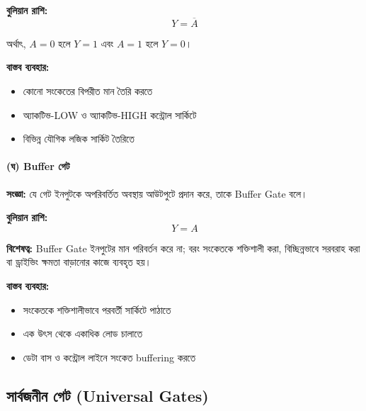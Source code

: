 \textbf{বুলিয়ান রাশি:}
\[
Y=\overline A
\]

অর্থাৎ, \(A=0\) হলে \(Y=1\) এবং \(A=1\) হলে \(Y=0\)।

\textbf{বাস্তব ব্যবহার:}
\begin{itemize}[label={{\bulletfont\textbullet}}, leftmargin=*, nosep]
    \item কোনো সংকেতের বিপরীত মান তৈরি করতে
    \item অ্যাকটিভ-\textenglish{LOW} ও অ্যাকটিভ-\textenglish{HIGH} কন্ট্রোল সার্কিটে
    \item বিভিন্ন যৌগিক লজিক সার্কিট তৈরিতে
\end{itemize}


\paragraph{(ঘ) \textenglish{Buffer} গেট}

\textbf{সংজ্ঞা:}
যে গেট ইনপুটকে অপরিবর্তিত অবস্থায় আউটপুটে প্রদান করে, তাকে \textenglish{Buffer Gate} বলে।

\textbf{বুলিয়ান রাশি:}
\[
Y=A
\]

\textbf{বিশেষত্ব:}
\textenglish{Buffer Gate} ইনপুটের মান পরিবর্তন করে না; বরং সংকেতকে শক্তিশালী করা, বিচ্ছিন্নভাবে সরবরাহ করা বা ড্রাইভিং ক্ষমতা বাড়ানোর কাজে ব্যবহৃত হয়।

\textbf{বাস্তব ব্যবহার:}
\begin{itemize}[label={{\bulletfont\textbullet}}, leftmargin=*, nosep]
    \item সংকেতকে শক্তিশালীভাবে পরবর্তী সার্কিটে পাঠাতে
    \item এক উৎস থেকে একাধিক লোড চালাতে
    \item ডেটা বাস ও কন্ট্রোল লাইনে সংকেত \textenglish{buffering} করতে
\end{itemize}



\subsection{সার্বজনীন গেট (\textenglish{Universal Gates})}

